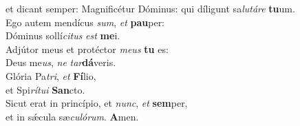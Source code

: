 \evenverse et dicant semper: Magnificétur Dóminus: qui díligunt sa\textit{lu}\textit{tá}\textit{re} \textbf{tu}um.\\
\oddverse Ego autem mendícus \textit{sum}, \textit{et} \textbf{pau}per:~\*\\
\oddverse Dóminus sollí\textit{ci}\textit{tus} \textit{est} \textbf{me}i.\\
\evenverse Adjútor meus et protéctor \textit{me}\textit{us} \textbf{tu} es:~\*\\
\evenverse Deus me\textit{us}, \textit{ne} \textit{tar}\textbf{dá}veris.\\
\oddverse Glória Pa\textit{tri}, \textit{et} \textbf{Fí}lio,~\*\\
\oddverse et Spi\textit{rí}\textit{tu}\textit{i} \textbf{San}cto.\\
\evenverse Sicut erat in princípio, et \textit{nunc}, \textit{et} \textbf{sem}per,~\*\\
\evenverse et in sǽcula sæ\textit{cu}\textit{ló}\textit{rum}. \textbf{A}men.\\
